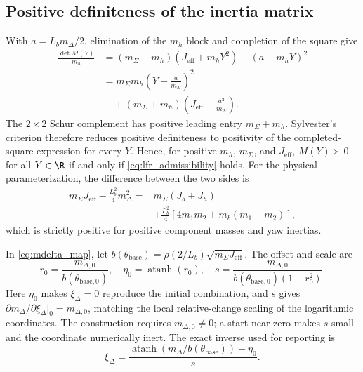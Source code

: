 \subsection{Positive definiteness of the inertia matrix}
\label{app:lfr-wellposed}
With $a=L_bm_\Delta/2$, elimination of the $m_h$ block and completion of the square give
\begin{equation*}
\begin{aligned}
  \frac{\det M(Y)}{m_h}
  &=(m_\Sigma+m_h)(J_{\mathrm{eff}}+m_hY^2)
    -(a-m_hY)^2\\
  &=m_\Sigma m_h\left(Y+\frac{a}{m_\Sigma}\right)^2\\
  &\quad +(m_\Sigma+m_h)
      \left(J_{\mathrm{eff}}-\frac{a^2}{m_\Sigma}\right).
\end{aligned}
\end{equation*}
The $2\times2$ Schur complement has positive leading entry
$m_\Sigma+m_h$. Sylvester's criterion therefore reduces positive definiteness
to positivity of the completed-square expression for every $Y$. Hence, for
positive $m_h$, $m_\Sigma$, and $J_{\mathrm{eff}}$, $M(Y)\succ0$ for all
$Y\in\R$ if and only if \eqref{eq:lfr_admissibility} holds.
For the physical parameterization, the difference between the two sides is
\begin{equation*}
\begin{aligned}
  m_\Sigma J_{\mathrm{eff}}-\frac{L_b^2}{4}m_\Delta^2
  ={}&m_\Sigma(J_b+J_h)\\
  &+\frac{L_b^2}{4}\left[4m_1m_2+m_b(m_1+m_2)\right],
\end{aligned}
\end{equation*}
which is strictly positive for positive component masses and yaw inertias.

In \eqref{eq:mdelta_map}, let
$b(\theta_{\mathrm{base}})=\rho(2/L_b)\sqrt{m_\Sigma J_{\mathrm{eff}}}$. The offset and scale
are
\begin{equation*}
 r_0=\frac{m_{\Delta,0}}{b(\theta_{\mathrm{base},0})},\quad
 \eta_0=\operatorname{atanh}(r_0),\quad
 s=\frac{m_{\Delta,0}}{b(\theta_{\mathrm{base},0})(1-r_0^2)}.
\end{equation*}
Here $\eta_0$ makes $\xi_\Delta=0$ reproduce the initial combination, and $s$
gives $\partial m_\Delta/\partial\xi_\Delta|_0=m_{\Delta,0}$, matching the local
relative-change scaling of the logarithmic coordinates. The construction
requires $m_{\Delta,0}\neq0$; a start near zero makes $s$ small and the
coordinate numerically inert. The exact inverse used for reporting is
\begin{equation*}
 \xi_\Delta=\frac{\operatorname{atanh}(m_\Delta/b(\theta_{\mathrm{base}}))-\eta_0}{s}.
\end{equation*}

